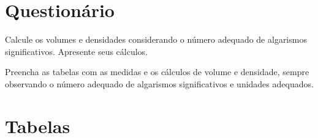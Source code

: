 \vspace{5mm}

\section{Questionário}

\begin{question}[type={exam}]
Calcule os volumes e densidades considerando o número adequado de algarismos significativos. Apresente seus cálculos.
\end{question}

\begin{question}[type={exam}]
Preencha as tabelas com as medidas e os cálculos de volume e densidade, sempre observando o número adequado de algarismos significativos e unidades adequados.
\end{question}


\vfill
\pagebreak
\section{Tabelas}


